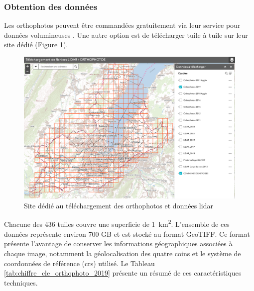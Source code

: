\subsubsection{Obtention des données}
Les orthophotos peuvent être commandées gratuitement via leur service pour données volumineuses \cite{sitg_commande_nodate}. Une autre option est de télécharger tuile à tuile sur leur site dédié (Figure \ref{fig:ch3_donnees_sitg_orthophotos_telechargement_web}).

\begin{figure}[H]
    \centering
    \includegraphics[width=1\linewidth]{02-main//figures//ch3/ch3_donnees_sitg_orthophotos_telechargement_web.png}
    \caption{Site dédié au téléchargement des orthophotos et données \gls{lidar} \cite{sitg_commande_nodate}}
    \label{fig:ch3_donnees_sitg_orthophotos_telechargement_web}
\end{figure}

Chacune des 436 tuiles couvre une superficie de \SI{1}{\square\kilo\meter}. L'ensemble de ces données représente environ 700 GB et est stocké au format GeoTIFF. Ce format présente l'avantage de conserver les informations géographiques associées à chaque image, notamment la géolocalisation des quatre coins et le système de coordonnées de référence (\acrshort{crs}) utilisé. Le Tableau \ref{tab:chiffre_cle_orthophoto_2019} présente un résumé de ces caractéristiques techniques.

